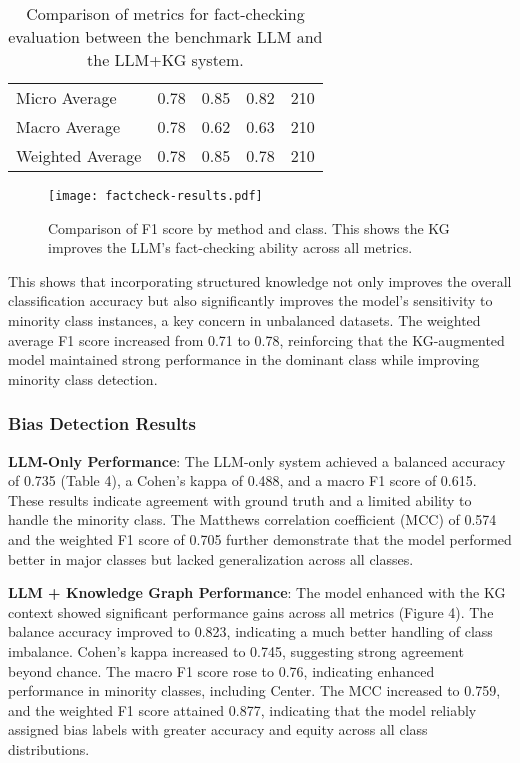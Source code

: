 \documentclass[11pt]{article}
\begin{document}
\begin{table}[H]
\begin{center}
\begin{tabular}{lcccc}
Micro Average    & 0.78                          & 0.85                       & 0.82                         & 210                         \\
Macro Average    & 0.78                          & 0.62                       & 0.63                         & 210                         \\
Weighted Average & 0.78                          & 0.85                       & 0.78                         & 210                         \\ \hline
\end{tabular}
\caption{Comparison of metrics for fact-checking evaluation between the benchmark LLM and the LLM+KG system.}
\label{tab:my_table}
\end{center}
\end{table}

\begin{figure}[H]
\begin{center}
\texttt{[image: factcheck-results.pdf]}
\end{center}
\caption{Comparison of F1 score by method and class. This shows the KG improves the LLM's fact-checking ability across all metrics.}
\label{fig:factcheck-results}
\end{figure}
This shows that incorporating structured knowledge not only improves the overall classification accuracy but also significantly improves the model’s sensitivity to minority class instances, a key concern in unbalanced datasets. The weighted average F1 score increased from 0.71 to 0.78, reinforcing that the KG-augmented model maintained strong performance in the dominant class while improving minority class detection.


\subsubsection{Bias Detection Results}
\textbf{LLM-Only Performance}: The LLM-only system achieved a balanced accuracy of 0.735 (Table 4), a Cohen’s kappa of 0.488, and a macro F1 score of 0.615. These results indicate agreement with ground truth and a limited ability to handle the minority class. The Matthews correlation coefficient (MCC) of 0.574 and the weighted F1 score of 0.705 further demonstrate that the model performed better in major classes but lacked generalization across all classes.
 
\textbf{LLM + Knowledge Graph Performance}: The model enhanced with the KG context showed significant performance gains across all metrics (Figure 4). The balance accuracy improved to 0.823, indicating a much better handling of class imbalance. Cohen’s kappa increased to 0.745, suggesting strong agreement beyond chance. The macro F1 score rose to 0.76, indicating enhanced performance in minority classes, including Center. The MCC increased to 0.759, and the weighted F1 score attained 0.877, indicating that the model reliably assigned bias labels with greater accuracy and equity across all class distributions. 
\end{document}
